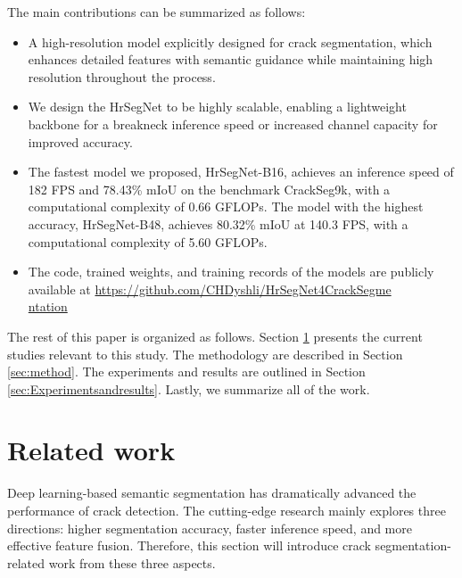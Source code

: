 \documentclass[preprint,12pt,authoryear]{elsarticle}
\begin{document}
The main contributions can be summarized as follows:
\begin{itemize}
    \item A high-resolution model explicitly designed for crack segmentation, which enhances detailed features with semantic guidance while maintaining high resolution throughout the process.
    \item We design the HrSegNet to be highly scalable, enabling a lightweight backbone for a breakneck inference speed or increased channel capacity for improved accuracy.
    \item The fastest model we proposed, HrSegNet-B16, achieves an inference speed of 182 FPS and 78.43\% mIoU on the benchmark CrackSeg9k, with a computational complexity of 0.66 GFLOPs. The model with the highest accuracy, HrSegNet-B48, achieves 80.32\% mIoU at 140.3 FPS, with a computational complexity of 5.60 GFLOPs.
    \item The code, trained weights, and training records of the models are publicly available at \href{https://github.com/CHDyshli/HrSegNet4CrackSegmentation}{https://github.com/CHDyshli/HrSegNet4CrackSegme\\ntation}
\end{itemize}

The rest of this paper is organized as follows. Section \ref{sec:relatedwork} presents the current studies relevant to this study. The methodology are described in Section \ref{sec:method}. The experiments and results are outlined in Section \ref{sec:Experimentsandresults}. Lastly, we summarize all of the work.




\section{Related work}
\label{sec:relatedwork}

Deep learning-based semantic segmentation has dramatically advanced the performance of crack detection. The cutting-edge research mainly explores three directions: higher segmentation accuracy, faster inference speed, and more effective feature fusion. Therefore, this section will introduce crack segmentation-related work from these three aspects.
\end{document}
